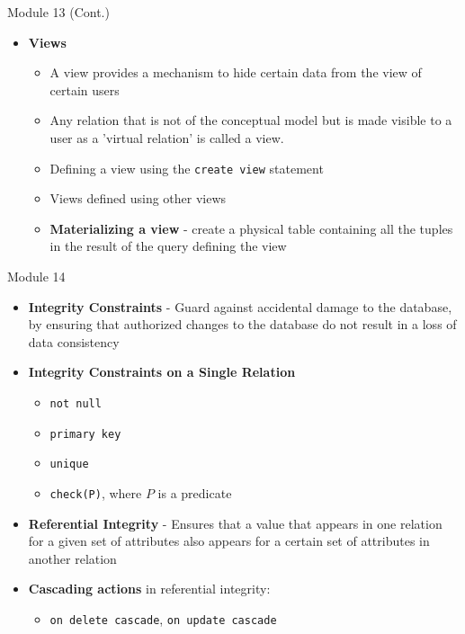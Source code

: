 \documentclass[aspectratio=169, xcolor=dvipsnames]{beamer}
\begin{document}
\begin{frame}{Module 13 (Cont.)}
    \begin{itemize}[<+->]
        \item \textbf{Views}
        \begin{itemize}
            \item[$\triangleright$] A view provides a mechanism to hide certain data from the view of certain users
            \item[$\triangleright$] Any relation that is not of the conceptual model but is made visible to a user as a 'virtual relation' is called a view.
            \item[$\triangleright$] Defining a view using the \texttt{create view} statement
            \item[$\triangleright$] Views defined using other views
            \item[$\triangleright$] \textbf{Materializing a view} - create a physical table containing all the tuples in the result of the query defining the view
        \end{itemize}
    \end{itemize}
\end{frame}

\begin{frame}{Module 14}
    \begin{itemize}[<+->]
        \item \textbf{Integrity Constraints} - Guard against accidental damage to the database, by ensuring that authorized changes to the database do not result in a loss of data consistency
        \item \textbf{Integrity Constraints on a Single Relation}
        \begin{itemize}
            \item[$\triangleright$] \texttt{not null}
            \item[$\triangleright$] \texttt{primary key}
            \item[$\triangleright$] \texttt{unique}
            \item[$\triangleright$] \texttt{check(P)}, where $P$ is a predicate
        \end{itemize}
        \item \textbf{Referential Integrity} - Ensures that a value that appears in one relation for a given set of attributes also appears for a certain set of attributes in another relation
        \item \textbf{Cascading actions} in referential integrity:
        \begin{itemize}
            \item[$\triangleright$] \texttt{on delete cascade}, \texttt{on update cascade}
        \end{itemize}
    \end{itemize}
\end{frame}
\end{document}
